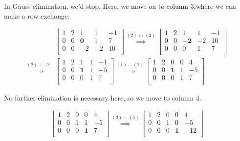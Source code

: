 In Gauss elimination, we'd stop. Here, we move on to column $3$,where we can make a row exchange:

\vspace{-\baselineskip}

\begin{align*}
    &\begin{bmatrix}
        1 & 2 & 1          & 1  & -1 \\
        0 & 0 & \mathbf{0} & 1  & 7  \\
        0 & 0 & -2         & -2 & 10 \\
    \end{bmatrix}
    \stackrel{(2)\mathbin{\leftrightarrow}(3)}{\implies}
    \begin{bmatrix}
        1 & 2 & 1           & 1  & -1 \\
        0 & 0 & \mathbf{-2} & -2 & 10 \\
        0 & 0 & 0           & 1  & 7  \\
    \end{bmatrix}
    \\
    \stackrel{(2)\div-2}{\implies}
    &\begin{bmatrix}
        1 & 2 & 1          & 1 & -1 \\
        0 & 0 & \mathbf{1} & 1 & -5 \\
        0 & 0 & 0          & 1 & 7  \\
    \end{bmatrix}
    \stackrel{(1)-(2)}{\implies}
    \begin{bmatrix}
        1 & 2 & 0          & 0 & 4  \\
        0 & 0 & \mathbf{1} & 1 & -5 \\
        0 & 0 & 0          & 1 & 7  \\
    \end{bmatrix}
\end{align*}

No further elimination is necessary here, so we move to column $4$.

\vspace{-\baselineskip}

\begin{align*}
    \begin{bmatrix}
        1 & 2 & 0 & 0          & 4  \\
        0 & 0 & 1 & 1          & -5 \\
        0 & 0 & 0 & \mathbf{1} & 7  \\
    \end{bmatrix}
    \stackrel{(2)-(3)}{\implies}
    \begin{bmatrix}
        1 & 2 & 0 & 0          & 4   \\
        0 & 0 & 1 & 0          & -5  \\
        0 & 0 & 0 & \mathbf{1} & -12 \\
    \end{bmatrix}
\end{align*}

